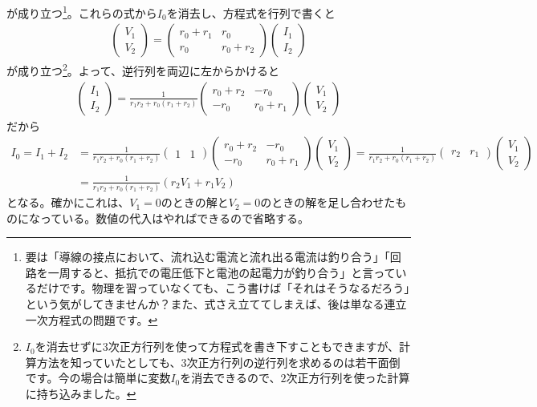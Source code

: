 が成り立つ\footnote{要は「導線の接点において、流れ込む電流と流れ出る電流は釣り合う」「回路を一周すると、抵抗での電圧低下と電池の起電力が釣り合う」と言っているだけです。物理を習っていなくても、こう書けば「それはそうなるだろう」という気がしてきませんか？また、式さえ立ててしまえば、後は単なる連立一次方程式の問題です。}。これらの式から$I_0$を消去し、方程式を行列で書くと
\begin{align*}
\begin{pmatrix}
V_1 \\
V_2
\end{pmatrix}
=
\begin{pmatrix}
r_0 + r_1 & r_0 \\
r_0 & r_0 + r_2
\end{pmatrix}
\begin{pmatrix}
I_1 \\
I_2
\end{pmatrix}
\end{align*}
が成り立つ\footnote{$I_0$を消去せずに$3$次正方行列を使って方程式を書き下すこともできますが、計算方法を知っていたとしても、$3$次正方行列の逆行列を求めるのは若干面倒です。今の場合は簡単に変数$I_0$を消去できるので、$2$次正方行列を使った計算に持ち込みました。}。よって、逆行列を両辺に左からかけると
\begin{align*}
\begin{pmatrix}
I_1 \\
I_2
\end{pmatrix}
=
\frac{1}{r_1 r_2 + r_0 (r_1 + r_2)}
\begin{pmatrix}
r_0 + r_2 & -r_0 \\
-r_0 & r_0 + r_1
\end{pmatrix}
\begin{pmatrix}
V_1 \\
V_2
\end{pmatrix}
\end{align*}
だから
\begin{align*}
I_0 = I_1 + I_2
&= \frac{1}{r_1 r_2 + r_0 (r_1 + r_2)}
\begin{pmatrix}
1 & 1
\end{pmatrix}
\begin{pmatrix}
r_0 + r_2 & -r_0 \\
-r_0 & r_0 + r_1
\end{pmatrix}
\begin{pmatrix}
V_1 \\
V_2
\end{pmatrix}
= \frac{1}{r_1 r_2 + r_0 (r_1 + r_2)}
\begin{pmatrix}
 r_2 & r_1
\end{pmatrix}
\begin{pmatrix}
V_1 \\
V_2
\end{pmatrix} \\
&= \frac{1}{r_1 r_2 + r_0 (r_1 + r_2)} (r_2 V_1 + r_1 V_2)
\end{align*}
となる。確かにこれは、$V_1 = 0$のときの解と$V_2 = 0$のときの解を足し合わせたものになっている。数値の代入はやればできるので省略する。

